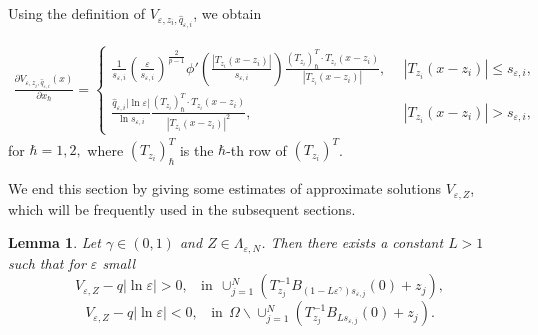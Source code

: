 \documentclass[12pt,reqno]{amsart}
\numberwithin{equation}{section}
\newtheorem{lemma}[theorem]{Lemma}
\theoremstyle{definition}
\theoremstyle{remark}
\begin{document}
Using the definition of $ V_{\varepsilon, z_i, \hat{q}_{\varepsilon,i}} $, we obtain

\begin{equation}\label{200}
\begin{split}
\frac{\partial V_{\varepsilon, z_i, \hat{q}_{\varepsilon,i}}(x)}{\partial x_\hbar}=\begin{cases}
\frac{1}{s_{\varepsilon,i}}(\frac{\varepsilon}{s_{\varepsilon,i}})^{\frac{2}{p-1}}\phi'(\frac{|T_{z_i}(x-z_i)|}{s_{\varepsilon,i}})\frac{(T_{z_i})_\hbar^T\cdot T_{z_i}(x-z_i)}{|T_{z_i}(x-z_i)|},\ \ &|T_{z_i}(x-z_i)|\leq s_{\varepsilon,i},\\
\frac{\hat{q}_{\varepsilon,i}|\ln\varepsilon|}{\ln s_{\varepsilon,i}}\frac{(T_{z_i})_\hbar^T\cdot T_{z_i}(x-z_i)}{|T_{z_i}(x-z_i)|^2},\ \ &|T_{z_i}(x-z_i)|> s_{\varepsilon,i},
\end{cases}
\end{split}
\end{equation}
for $ \hbar=1,2, $ where $ (T_{z_i})_\hbar^T $ is the $\hbar$-th row of $ (T_{z_i})^T $.

We end this section by giving %
 some estimates of approximate solutions $ V_{\varepsilon,Z} $, which will be frequently used in the subsequent sections.
\begin{lemma}\label{lemA-5}
	Let $\gamma\in(0,1)$ and $ Z\in \Lambda_{\varepsilon, N} $. Then there exists a constant $ L > 1 $ such that for $ \varepsilon $ small
	\begin{equation*}
	V_{\varepsilon,Z}-q|\ln\varepsilon|>0,\ \ \  \ \text{in}\ \   \cup_{j=1}^N\left( T_{z_j}^{-1}B_{\left( 1-L \varepsilon^\gamma \right) s_{\varepsilon,j}}(0)+z_j\right),
	\end{equation*}
	\begin{equation*}
	V_{\varepsilon,Z}-q|\ln\varepsilon|<0,\ \ \  \ \text{in}\ \  \Omega\backslash\cup_{j=1}^N\left( T_{z_j}^{-1}B_{Ls_{\varepsilon,j}}(0)+z_j\right).
	\end{equation*}
	
\end{lemma}
\end{document}
